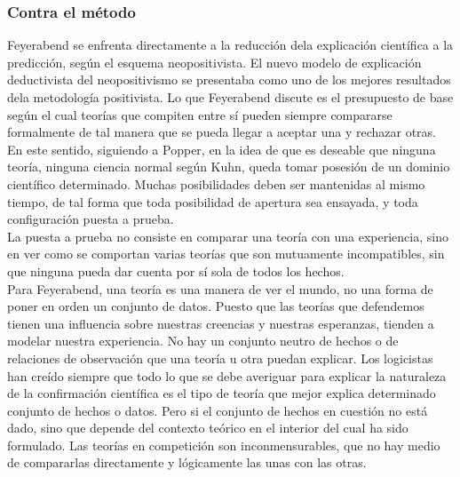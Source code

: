 \documentclass[a4paper, 11pt, twocolumn, spanish]{article}
\begin{document}
\subsubsection{Contra el método}
\label{sec:orga990ea1}
Feyerabend se enfrenta directamente a la reducción dela explicación
científica a la predicción, según el esquema neopositivista. El nuevo
modelo de explicación deductivista del neopositivismo se presentaba
como uno de los mejores resultados dela metodología positivista. Lo que
Feyerabend discute es el presupuesto de base según el cual teorías que
compiten entre sí pueden siempre compararse formalmente de tal manera
que se pueda llegar a aceptar una y rechazar otras. En este sentido,
siguiendo a Popper, en la idea de que es deseable que ninguna teoría,
ninguna ciencia normal según Kuhn, queda tomar posesión de un dominio
científico determinado. Muchas posibilidades deben ser mantenidas al
mismo tiempo, de tal forma que toda posibilidad de apertura sea
ensayada, y toda configuración puesta a prueba.\\[0pt]

La puesta a prueba no consiste en comparar una teoría con una
experiencia, sino en ver como se comportan varias teorías que son
mutuamente incompatibles, sin que ninguna pueda dar cuenta por sí sola
de todos los hechos.\\[0pt]
Para Feyerabend, una teoría es una manera de ver el mundo, no una
forma de poner en orden un conjunto de datos. Puesto que las teorías
que defendemos tienen una influencia sobre nuestras creencias y
nuestras esperanzas, tienden a modelar nuestra experiencia. No hay un
conjunto neutro de hechos o de relaciones de observación que una
teoría u otra puedan explicar. Los logicistas han creído siempre que
todo lo que se debe averiguar para explicar la naturaleza de la
confirmación científica es el tipo de teoría que mejor explica
determinado conjunto de hechos o datos. Pero si el conjunto de hechos
en cuestión no está dado, sino que depende del contexto teórico en el
interior del cual ha sido formulado. Las teorías en competición son
inconmensurables, que no hay medio de compararlas directamente y
lógicamente las unas con las otras.\\[0pt]
\end{document}
